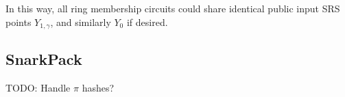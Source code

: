 In this way, all ring membership circuits could share identical
public input SRS points $Y_{1,\gamma}$, and similarly $Y_0$ if desired.



\subsection{SnarkPack}

TODO: Handle $\pi$ hashes?


